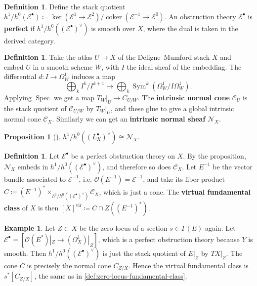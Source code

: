 \documentclass{report}
\theoremstyle{plain}
\newtheorem{proposition}[theorem]{Proposition}
\theoremstyle{definition}
\newtheorem{definition}[theorem]{Definition}
\newtheorem{example}[theorem]{Example}
\theoremstyle{remark}
\newcommand{\cC}{\mathcal{C}}
\newcommand{\cE}{\mathcal{E}}
\newcommand{\cN}{\mathcal{N}}
\newcommand{\cO}{\mathcal{O}}
\DeclareMathOperator{\Sym}{Sym}
\DeclareMathOperator{\coker}{coker}
\DeclareMathOperator{\Spec}{Spec}
\newcommand{\vir}{\mathrm{vir}}
\begin{document}
\begin{definition}
  Define the stack quotient $h^1/h^0(\cE^\bullet) \coloneqq \ker(\cE^1
  \to \cE^2)/\coker(\cE^{-1} \to \cE^0)$. An obstruction theory
  $\cE^\bullet$ is {\bf perfect} if $h^1/h^0((\cE^\bullet)^\vee)$ is
  smooth over $X$, where the dual is taken in the derived category.
\end{definition}

\begin{definition}
  Take the atlas $U \to X$ of the Deligne--Mumford stack $X$ and embed
  $U$ in a smooth scheme $W$, with $I$ the ideal sheaf of the
  embedding. The differential $d\colon I \to \Omega^1_W$ induces a map
  \[ \bigoplus_k I^k/I^{k+1} \to \bigoplus_k \Sym^k(\Omega^1_W/I\Omega^1_W). \]
  Applying $\Spec$ we get a map $T_W|_U \to C_{U/W}$. The {\bf
    intrinsic normal cone} $\cC_U$ is the stack quotient of
  $\cC_{U/W}$ by $T_W|_U$, and these glue to give a global intrinsic
  normal cone $\cC_X$. Similarly we can get an {\bf intrinsic normal
    sheaf} $\cN_X$.
\end{definition}

\begin{proposition}[{\cite[pp. 66--69]{Behrend1997}}]
  $h^1/h^0((L_X^\bullet)^\vee) \cong \cN_X$.
\end{proposition}

\begin{definition} \label{def:virtual-fundamental-class}
  Let $\cE^\bullet$ be a perfect obstruction theory on $X$. By the
  proposition, $\cN_X$ embeds in $h^1/h^0((\cE^\bullet)^\vee)$, and
  therefore so does $\cC_X$. Let $E^{-1}$ be the vector bundle
  associated to $\cE^{-1}$, i.e. $\cO(E^{-1}) = \cE^{-1}$, and take
  its fiber product $C \coloneqq (E^{-1})^*
  \times_{h^1/h^0((\cE^\bullet)^\vee)} \cC_X$, which is just a cone.
  The {\bf virtual fundamental class} of $X$ is then $[X]^{\vir}
  \coloneqq C \cap Z((E^{-1})^*)$.
\end{definition}

\begin{example}
  Let $Z \subset X$ be the zero locus of a section $s \in \Gamma(E)$
  again. Let $\cE^\bullet = [\cO(E^*)|_Z \to (\Omega^1_X)|_Z]$,
  which is a perfect obstruction theory because $Y$ is smooth. Then
  $h^1/h^0((\cE^\bullet)^\vee)$ is just the stack quotient of $E|_Z$
  by $TX|_Z$. The cone $C$ is precisely the normal cone
  $C_{Z/X}$. Hence the virtual fundamental class is $s^*[C_{Z/X}]$,
  the same as in \ref{def:zero-locus-fundamental-class}.
\end{example}
\end{document}
